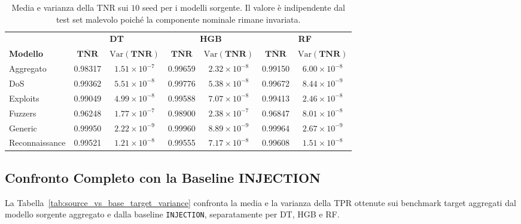 \begin{table}[H]
    \centering
    \footnotesize
    \caption{Media e varianza della TNR sui $10$ seed per i modelli sorgente. Il valore è indipendente dal test set malevolo poiché la componente nominale rimane invariata.}
    \label{tab:sorgente_tnr_multiseed}
    \begin{tabular}{lcc|cc|cc}
        \toprule
        & \multicolumn{2}{c|}{\textbf{DT}} & \multicolumn{2}{c|}{\textbf{HGB}} & \multicolumn{2}{c}{\textbf{RF}} \\
        \textbf{Modello} & $\boldsymbol{\overline{TNR}}$ & $\boldsymbol{\mathrm{Var}(TNR)}$ & $\boldsymbol{\overline{TNR}}$ & $\boldsymbol{\mathrm{Var}(TNR)}$ & $\boldsymbol{\overline{TNR}}$ & $\boldsymbol{\mathrm{Var}(TNR)}$ \\
        \midrule
        Aggregato & 0.98317 & $1.51\times10^{-7}$ & 0.99659 & $2.32\times10^{-8}$ & 0.99150 & $6.00\times10^{-8}$ \\
        DoS & 0.99362 & $5.51\times10^{-8}$ & 0.99776 & $5.38\times10^{-8}$ & 0.99672 & $8.44\times10^{-9}$ \\
        Exploits & 0.99049 & $4.99\times10^{-8}$ & 0.99588 & $7.07\times10^{-8}$ & 0.99413 & $2.46\times10^{-8}$ \\
        Fuzzers & 0.96248 & $1.77\times10^{-7}$ & 0.98900 & $2.38\times10^{-7}$ & 0.96847 & $8.01\times10^{-8}$ \\
        Generic & 0.99950 & $2.22\times10^{-9}$ & 0.99960 & $8.89\times10^{-9}$ & 0.99964 & $2.67\times10^{-9}$ \\
        Reconnaissance & 0.99521 & $1.21\times10^{-8}$ & 0.99555 & $7.17\times10^{-8}$ & 0.99608 & $1.51\times10^{-8}$ \\
        \bottomrule
    \end{tabular}
\end{table}


\subsection{Confronto Completo con la Baseline INJECTION}

La Tabella~\ref{tab:source_vs_base_target_variance} confronta la media e la varianza della TPR ottenute sui benchmark target aggregati dal modello sorgente aggregato e dalla baseline \texttt{INJECTION}, separatamente per DT, HGB e RF.

